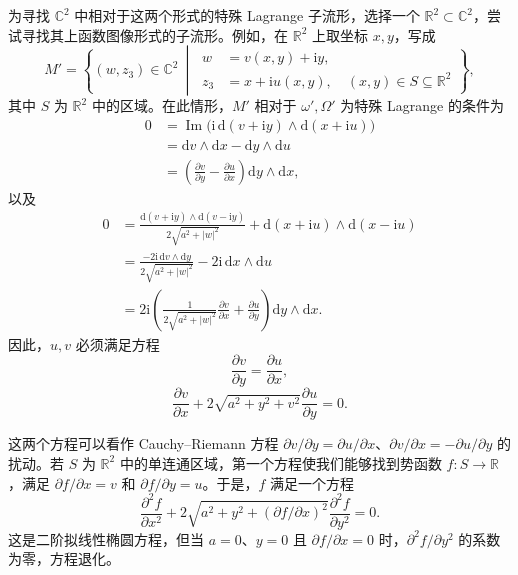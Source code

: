 为寻找 $\mathbb C^2$ 中相对于这两个形式的特殊 Lagrange 子流形，选择一个 $\mathbb R^2\subset\mathbb C^2$，尝试寻找其上函数图像形式的子流形。例如，在 $\mathbb R^2$ 上取坐标 $x,y$，写成
\[
M'=\left\{(w,z_3)\in\mathbb C^2\ \middle|\
\begin{aligned}
w&=v(x,y)+\mathrm i y,\\
z_3&=x+\mathrm i u(x,y),\quad(x,y)\in S\subseteq\mathbb R^2
\end{aligned}\right\},
\]
其中 $S$ 为 $\mathbb R^2$ 中的区域。在此情形，$M'$ 相对于 $\omega',\Omega'$ 为特殊 Lagrange 的条件为
\[
\begin{aligned}
0&=\operatorname{Im}\bigl(\mathrm i\,\mathrm d(v+\mathrm i y)
\wedge\mathrm d(x+\mathrm i u)\bigr)\\
&=\mathrm dv\wedge\mathrm dx-\mathrm dy\wedge\mathrm du\\
&=\left(\frac{\partial v}{\partial y}
-\frac{\partial u}{\partial x}\right)\mathrm dy\wedge\mathrm dx,
\end{aligned}
\]
以及
\[
\begin{aligned}
0&=\frac{\mathrm d(v+\mathrm i y)\wedge\mathrm d(v-\mathrm i y)}
{2\sqrt{a^2+|w|^2}}
+\mathrm d(x+\mathrm i u)\wedge\mathrm d(x-\mathrm i u)\\
&=\frac{-2\mathrm i\,\mathrm dv\wedge\mathrm dy}{2\sqrt{a^2+|w|^2}}
-2\mathrm i\,\mathrm dx\wedge\mathrm du\\
&=2\mathrm i\left(\frac1{2\sqrt{a^2+|w|^2}}\frac{\partial v}{\partial x}
+\frac{\partial u}{\partial y}\right)\mathrm dy\wedge\mathrm dx.
\end{aligned}
\]
因此，$u,v$ 必须满足方程
\setcounter{equation}{0}
\begin{equation}\label{eq:7.1}
\frac{\partial v}{\partial y}=\frac{\partial u}{\partial x},
\end{equation}
\begin{equation}\label{eq:7.2}
\frac{\partial v}{\partial x}
+2\sqrt{a^2+y^2+v^2}\frac{\partial u}{\partial y}=0.
\end{equation}

这两个方程可以看作 Cauchy--Riemann 方程 $\partial v/\partial y=\partial u/\partial x$、$\partial v/\partial x=-\partial u/\partial y$ 的扰动。若 $S$ 为 $\mathbb R^2$ 中的单连通区域，第一个方程使我们能够找到势函数 $f\colon S\to\mathbb R$，满足 $\partial f/\partial x=v$ 和 $\partial f/\partial y=u$。于是，$f$ 满足一个方程
\begin{equation}\label{eq:7.3}
\frac{\partial^2f}{\partial x^2}
+2\sqrt{a^2+y^2+(\partial f/\partial x)^2}
\frac{\partial^2f}{\partial y^2}=0.
\end{equation}
这是二阶拟线性椭圆方程，但当 $a=0$、$y=0$ 且 $\partial f/\partial x=0$ 时，$\partial^2f/\partial y^2$ 的系数为零，方程退化。

